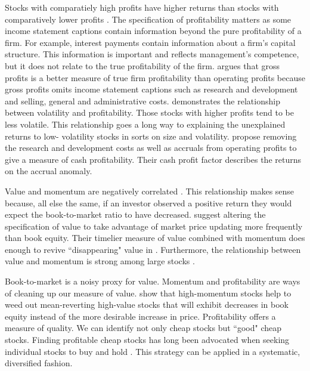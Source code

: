 Stocks with comparatiely high profits have higher returns than stocks with comparatively
lower profits \parencite{fama2006profitability}. The specification of profitability
matters as some income statement captions contain information beyond the pure
profitability of a firm. For example, interest payments contain information about a firm’s
capital structure. This information is important and reflects management’s competence, but
it does not relate to the true profitability of the firm. \textcite{novy2013other} argues
that gross profits is a better measure of true firm profitability than operating profits
because gross profits omits income statement captions such as research and development and
selling, general and administrative costs. \textcite{novy2014understanding} demonstrates
the relationship between volatility and profitability. Those stocks with higher profits
tend to be less volatile. This relationship goes a long way to explaining the unexplained
returns to low- volatility stocks in sorts on size and volatility.
\textcite{ball2016accruals} propose removing the research and development costs as well as
accruals from operating profits to give a measure of cash profitability. Their cash profit
factor describes the returns on the accrual anomaly.

Value and momentum are negatively correlated \parencite{asness1997interaction}. This
relationship makes sense because, all else the same, if an investor observed a positive
return they would expect the book-to-market ratio to have decreased.
\textcite{asness2013devil} suggest altering the specification of value to take advantage
of market price updating more frequently than book equity. Their timelier measure of value
combined with momentum does enough to revive ``disappearing" value in
\textcite{fama2015five}. Furthermore, the relationship between value and momentum is
strong among large stocks \parencite{asness2015fact}.

Book-to-market is a noisy proxy for value. Momentum and profitability are ways of cleaning
up our measure of value. \textcite{kok2017facts} show that high-momentum stocks help to
weed out mean-reverting high-value stocks that will exhibit decreases in book equity
instead of the more desirable increase in price. Profitability offers a measure of
quality. We can identify not only cheap stocks but ``good" cheap stocks. Finding
profitable cheap stocks has long been advocated when seeking individual stocks to buy and
hold \parencite{graham1934security}. This strategy can be applied in a systematic,
diversified fashion.
